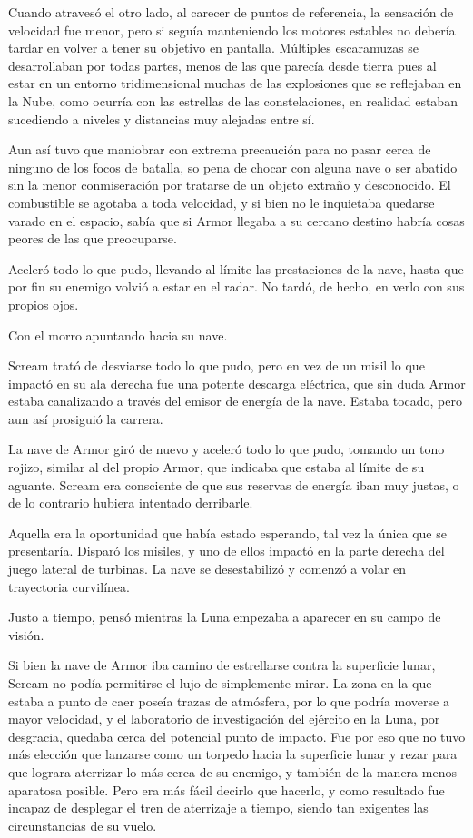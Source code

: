 Cuando atravesó el otro lado, al carecer de puntos de referencia, la sensación de velocidad fue menor, pero si seguía manteniendo los motores estables no debería tardar en volver a tener su objetivo en pantalla. Múltiples escaramuzas se desarrollaban por todas partes, menos de las que parecía desde tierra pues al estar en un entorno tridimensional muchas de las explosiones que se reflejaban en la Nube, como ocurría con las estrellas de las constelaciones, en realidad estaban sucediendo a niveles y distancias muy alejadas entre sí.

Aun así tuvo que maniobrar con extrema precaución para no pasar cerca de ninguno de los focos de batalla, so pena de chocar con alguna nave o ser abatido sin la menor conmiseración por tratarse de un objeto extraño y desconocido. El combustible se agotaba a toda velocidad, y si bien no le inquietaba quedarse varado en el espacio, sabía que si Armor llegaba a su cercano destino habría cosas peores de las que preocuparse.

Aceleró todo lo que pudo, llevando al límite las prestaciones de la nave, hasta que por fin su enemigo volvió a estar en el radar. No tardó, de hecho, en verlo con sus propios ojos.

Con el morro apuntando hacia su nave.

Scream trató de desviarse todo lo que pudo, pero en vez de un misil lo que impactó en su ala derecha fue una potente descarga eléctrica, que sin duda Armor estaba canalizando a través del emisor de energía de la nave. Estaba tocado, pero aun así prosiguió la carrera.

La nave de Armor giró de nuevo y aceleró todo lo que pudo, tomando un tono rojizo, similar al del propio Armor, que indicaba que estaba al límite de su aguante. Scream era consciente de que sus reservas de energía iban muy justas, o de lo contrario hubiera intentado derribarle.

Aquella era la oportunidad que había estado esperando, tal vez la única que se presentaría. Disparó los misiles, y uno de ellos impactó en la parte derecha del juego lateral de turbinas. La nave se desestabilizó y comenzó a volar en trayectoria curvilínea.

Justo a tiempo, pensó mientras la Luna empezaba a aparecer en su campo de visión.

Si bien la nave de Armor iba camino de estrellarse contra la superficie lunar, Scream no podía permitirse el lujo de simplemente mirar. La zona en la que estaba a punto de caer poseía trazas de atmósfera, por lo que podría moverse a mayor velocidad, y el laboratorio de investigación del ejército en la Luna, por desgracia, quedaba cerca del potencial punto de impacto. Fue por eso que no tuvo más elección que lanzarse como un torpedo hacia la superficie lunar y rezar para que lograra aterrizar lo más cerca de su enemigo, y también de la manera menos aparatosa posible. Pero era más fácil decirlo que hacerlo, y como resultado fue incapaz de desplegar el tren de aterrizaje a tiempo, siendo tan exigentes las circunstancias de su vuelo.

